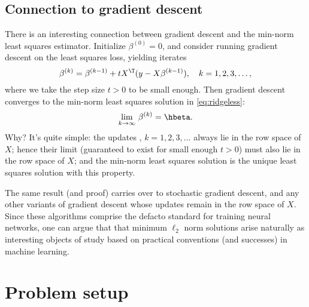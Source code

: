 \documentclass{article}
\begin{document}
\subsection{Connection to gradient descent}

There is an interesting connection between gradient descent and the min-norm
least squares estimator. Initialize $\beta^{(0)} = 0$, and consider running
gradient descent on the least squares loss, yielding iterates
\[
\beta^{(k)} = \beta^{(k-1)} + t X^\T (y-X\beta^{(k-1)}), 
\quad k=1,2,3,\dots,
\]
where we take the step size $t>0$ to be small enough. Then gradient descent
converges to the min-norm least squares solution in \eqref{eq:ridgeless}: 
\[
\lim_{k \to \infty} \, \beta^{(k)} = \hbeta.
\]
Why? It's quite simple: the updates , $k=1,2,3,\dots$
always lie in the row space of $X$; hence their limit (guaranteed to exist for
small enough $t>0$) must also lie in the row space of $X$; and the min-norm
least squares solution is the unique least squares solution with this property.    

The same result (and proof) carries over to stochastic gradient descent, and any 
other variants of gradient descent whose updates remain in the row space of $X$.  
Since these algorithms comprise the defacto standard for training neural
networks, one can argue that that minimum $\ell_2$ norm solutions arise
naturally as interesting objects of study based on practical conventions (and
successes) in machine learning.  

\section{Problem setup}

\def\asto{\overset{\mathrm{as}}{\to}}
\def\dto{\overset{d}{\to}}
\def\Risk{\mathrm{Risk}}
\def\Bias{\mathrm{Bias}}
\def\hSigma{\hat\Sigma}
\end{document}
